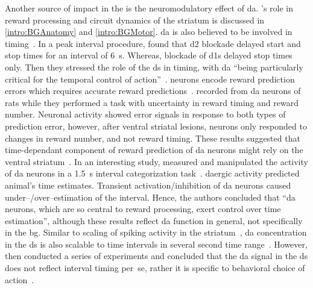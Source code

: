 \par
Another source of impact in the  is the neuromodulatory effect of \gls{da}.
's role in reward processing and circuit dynamics of the striatum is discussed in \autoref{intro:BGAnatomy} and \autoref{intro:BGMotor}.
\Gls{da} is also believed to be involved in timing~\cite{Paton2018NeuronRev}.
In a peak interval procedure\footnotemark,  found that \gls{d2} blockade delayed start and stop times for an interval of 6~s.
Whereas, blockade of \glspl{d1} delayed stop times only.
Then they stressed the role of the \gls{ds} in timing, with \gls{da} ``being particularly critical for the temporal control of action''~\cite{DeCorte2019}.
 neurons encode reward prediction errors which requires accurate reward predictions~\cite[see][]{Berke2018NN}.
 recorded from \gls{da} neurons of rats while they performed a task with uncertainty in reward timing and reward number.
Neuronal activity showed error signals in response to both types of prediction error, however, after ventral striatal lesions, neurons only responded to changes in reward number, and not reward timing.
These results suggested that time-dependant component of reward prediction of \gls{da} neurons might rely on the ventral striatum~\cite{Takahashi2016}.
In an interesting study,  measured and manipulated the activity of \gls{da} neurons in a 1.5~s interval categorization task~\cite{Paton2016Sci}.
\Gls{da}ergic activity predicted animal's time estimates.
Transient activation/inhibition of \gls{da} neurons caused under--/over--estimation of the interval.
Hence, the authors concluded that ``\gls{da} neurons, which are so central to reward processing, exert control over time estimation'', although these results reflect \gls{da} function in general, not specifically in the \gls{bg}.
Similar to scaling of spiking activity in the striatum~\cite{Mello2015}, \gls{da} concentration in the \gls{ds} is also scalable to time intervals in several second time range~\cite{Howard2017}.
However, \citeauthor{Howard2017} then conducted a series of experiments and concluded that the \gls{da} signal in the \gls{ds} does not reflect interval timing per~se, rather it is specific to behavioral choice of action~\cite{Howard2017}.
